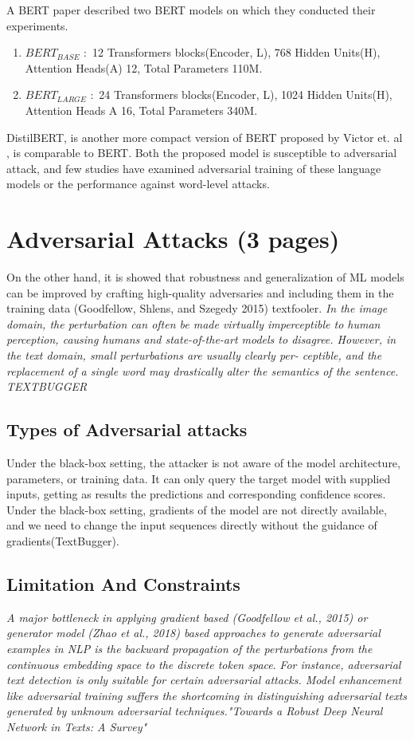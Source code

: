 \documentclass[%
	BCOR=8mm, %
	DIV=12, 
	toc=bibliography, %
	toc=listof, %
	oneside, %
	egregdoesnotlikesansseriftitles, %
	]{scrbook}
\begin{document}
A BERT paper \cite{devlin_bert_2019} described two BERT models on which they conducted their experiments.
\begin{enumerate}
\item $BERT_{BASE}$ $:$ 12 Transformers blocks(Encoder, L), 768 Hidden Units(H), Attention Heads(A) 12, Total Parameters 110M.
\item $BERT_{LARGE}$ $:$ 24 Transformers blocks(Encoder, L), 1024 Hidden Units(H), Attention Heads A 16, Total Parameters 340M.
\end{enumerate}
DistilBERT, is another more compact version of BERT proposed by Victor et$.$ al \cite{sanh_distilbert_2020}, is comparable to BERT. Both the proposed model is susceptible to adversarial 
attack, and few studies have examined adversarial training of these language models or the performance against word-level attacks.\\



\section{Adversarial Attacks (3 pages)}
On the other hand, it is showed that robustness and generalization of ML models can be improved by crafting high-quality adversaries and including them in the training data 
(Goodfellow, Shlens, and Szegedy 2015) textfooler. \textit{In the image domain, the perturbation can often be made virtually imperceptible to human perception, causing humans 
and state-of-the-art models to disagree. However, in the text domain, small perturbations are usually clearly per- ceptible, and the replacement of a single word may drastically alter 
the semantics of the sentence. TEXTBUGGER }

\subsection{Types of Adversarial attacks}
Under the black-box setting, the attacker is not aware of the model architecture, parameters, or training data. It can only query the target model with supplied inputs, getting as 
results the predictions and corresponding confidence scores. Under the black-box setting, gradients of the model are not directly available, and we need to change the input sequences
 directly without the guidance of gradients(TextBugger). 

\subsection{Limitation And Constraints}
\textit{A major bottleneck in applying gradient based (Goodfellow et al., 2015) or generator model (Zhao et al., 2018) based approaches to generate adversarial examples in NLP is
 the backward propagation of the perturbations from the continuous embedding space to the discrete token space}.\cite{garg_bae_2020} \textit{For instance, adversarial text detection 
 is only suitable for certain adversarial attacks. Model enhancement like adversarial training suffers the shortcoming in distinguishing adversarial texts generated by unknown adversarial 
 techniques."Towards a Robust Deep Neural Network in Texts: A Survey\(\)"} 
 
\end{document}

